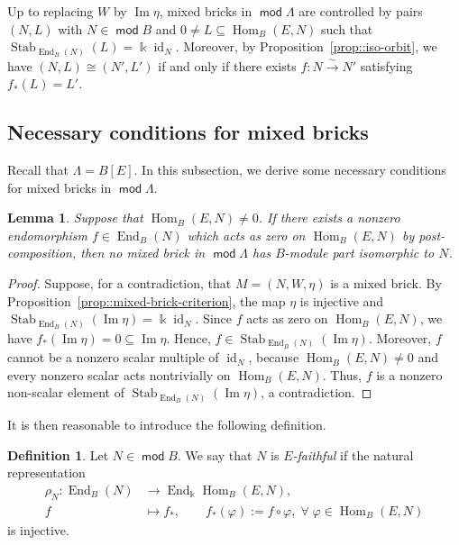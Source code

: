 \documentclass[a4,12pt]{amsart}
\numberwithin{equation}{section} %
\def\Hom{\operatorname{Hom}} %
\def\End{\operatorname{End}} %
\def\Im{\operatorname{Im}} %
\def\Stab{\operatorname{Stab}} %
\def\mod{\operatorname{\mathsf{mod}}}
\newtheorem{lemma}[theorem]{Lemma} %
\theoremstyle{definition} %
\newtheorem{definition}[theorem]{Definition} %
\begin{document}
Up to replacing $W$ by $\Im\eta$, mixed bricks in $\mod \Lambda$ are controlled by pairs $(N,L)$ with $N\in\mod B$ and $0\neq L\subseteq\Hom_B(E,N)$ such that $\Stab_{\End_B(N)}(L) = \Bbbk\operatorname{id}_{N}$. Moreover, by Proposition~\ref{prop::iso-orbit}, we have $(N,L) \cong (N',L')$ if and only if there exists $f\colon N \xrightarrow{\sim} N'$ satisfying $f_*(L) = L'$.

\subsection{Necessary conditions for mixed bricks}
Recall that $\Lambda=B[E]$. In this subsection, we derive some necessary conditions for mixed bricks in $\mod \Lambda$.

\begin{lemma}\label{lem:zero-action}
Suppose that $\Hom_B(E,N)\neq0$. If there exists a nonzero endomorphism $f\in\End_B(N)$ which acts as zero on $\Hom_B(E,N)$ by post-composition, then no mixed brick in $\mod \Lambda$ has $B$-module part isomorphic to $N$.
\end{lemma}
\begin{proof}
Suppose, for a contradiction, that $M=(N,W,\eta)$ is a mixed brick. By Proposition~\ref{prop::mixed-brick-criterion}, the map $\eta$ is injective and $\Stab_{\End_B(N)}(\Im\eta)=\Bbbk\operatorname{id}_{N}$. Since $f$ acts as zero on $\Hom_B(E,N)$, we have $f_*(\Im\eta)=0\subseteq \Im\eta$. 
Hence, $f\in\Stab_{\End_B(N)}(\Im\eta)$. 
Moreover, $f$ cannot be a nonzero scalar multiple of $\operatorname{id}_{N}$, because $\Hom_B(E,N)\neq0$ and every nonzero scalar acts nontrivially on $\Hom_B(E,N)$. 
Thus, $f$ is a nonzero non-scalar element of $\Stab_{\End_B(N)}(\Im\eta)$, a contradiction. 
\end{proof}

It is then reasonable to introduce the following definition.
\begin{definition}\label{def::E-faithful-module}
Let $N\in \mod B$. We say that $N$ is \emph{$E$-faithful} if the natural representation
\[
\begin{aligned}
\rho_N\colon \End_B(N)&\longrightarrow \End_{\Bbbk}\Hom_B(E,N),\\
f&\longmapsto f_*,
\qquad
f_*(\varphi):=f\circ\varphi,\; \forall \; \varphi\in\Hom_B(E,N)
\end{aligned}
\]
is injective.
\end{definition}
\end{document}
